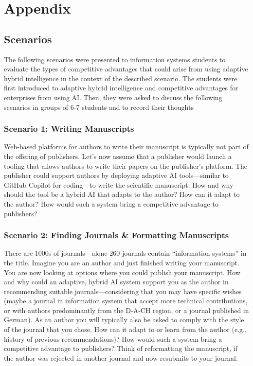 \section{Appendix}

\subsection{Scenarios}

The following scenarios were presented to information systems students to evaluate the types of
competitive advantages that could arise from using adaptive hybrid intelligence in the context
of the described scenario. The students were first introduced to adaptive hybrid intelligence and
competitive advantages for enterprises from using AI. Then, they were asked to discuss the following
scenarios in groups of 6-7 students and to record their thoughts


\subsubsection{Scenario 1: Writing Manuscripts}

Web-based platforms for authors to write their manuscript is typically not part of the offering of
publishers. Let's now assume that a publisher would launch a tooling that allows authors to write
their papers on the publisher's platform. The publisher could support authors by deploying adaptive
AI tools---similar to GitHub Copilot for coding---to write the scientific manuscript. How and why
should the tool be a hybrid AI that adapts to the author? How can it adapt to the author? How would
such a system bring a competitive advantage to publishers?


\subsubsection{Scenario 2: Finding Journals \& Formatting Manuscripts}

There are 1000s of journals---alone 260 journals contain “information systems” in the title. Imagine
you are an author and just finished writing your manuscript. You are now looking at options where you
could publish your manuscript. How and why could an adaptive, hybrid AI system support you as the author
in recommending suitable journals---considering that you may have specific wishes (maybe a journal in
information system that accept more technical contributions, or with authors predominantly from the D-A-CH
region, or a journal published in German). As an author you will typically also be asked to comply with the
style of the journal that you chose. How can it adapt to or learn from the author (e.g., history of previous
recommendations)? How would such a system bring a competitive advantage to publishers? Think of reformatting
the manuscript, if the author was rejected in another journal and now resubmits to your journal.


